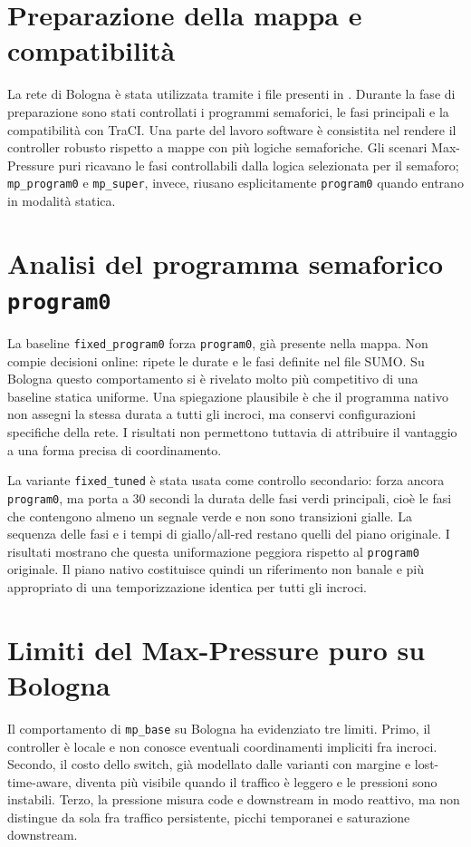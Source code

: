 \documentclass[12pt,a4paper,oneside]{report}
\numberwithin{equation}{chapter}
\begin{document}
\section{Preparazione della mappa e compatibilità}

La rete di Bologna è stata utilizzata tramite i file presenti in
. Durante la fase di preparazione sono stati
controllati i programmi semaforici, le fasi principali e la compatibilità con
TraCI. Una parte del lavoro software è consistita nel rendere il controller
robusto rispetto a mappe con più logiche semaforiche. Gli scenari Max-Pressure
puri ricavano le fasi controllabili dalla logica selezionata per il semaforo;
\texttt{mp\_program0} e \texttt{mp\_super}, invece, riusano esplicitamente
\texttt{program0} quando entrano in modalità statica.

\section{Analisi del programma semaforico \texttt{program0}}

La baseline \texttt{fixed\_program0} forza \texttt{program0}, già
presente nella mappa. Non compie decisioni online: ripete le durate e le fasi
definite nel file SUMO. Su Bologna questo comportamento si è rivelato molto più
competitivo di una baseline statica uniforme. Una spiegazione plausibile è che
il programma nativo non assegni la stessa durata a tutti gli incroci, ma
conservi configurazioni specifiche della rete. I risultati non permettono
tuttavia di attribuire il vantaggio a una forma precisa di coordinamento.

La variante \texttt{fixed\_tuned} è stata usata come controllo secondario:
forza ancora \texttt{program0}, ma porta a 30 secondi la durata delle fasi verdi
principali, cioè le fasi che contengono almeno un segnale verde e non sono
transizioni gialle. La sequenza delle fasi e i tempi di giallo/all-red restano
quelli del piano originale. I risultati mostrano che questa uniformazione
peggiora rispetto al \texttt{program0} originale. Il piano nativo costituisce
quindi un riferimento non banale e più appropriato di una temporizzazione
identica per tutti gli incroci.

\section{Limiti del Max-Pressure puro su Bologna}

Il comportamento di \texttt{mp\_base} su Bologna ha evidenziato tre limiti.
Primo, il controller è locale e non conosce eventuali coordinamenti impliciti
fra incroci. Secondo, il costo dello switch, già modellato dalle varianti con
margine e lost-time-aware, diventa più visibile quando il traffico è leggero e
le pressioni sono instabili. Terzo, la pressione misura code e downstream in
modo reattivo, ma non distingue da sola fra traffico persistente, picchi
temporanei e saturazione downstream.
\end{document}
